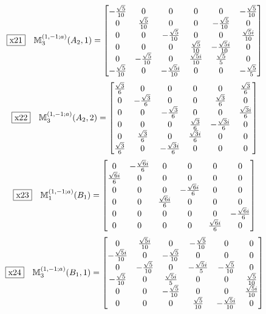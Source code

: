 \documentclass[fleqn,10pt,landscape]{jsarticle}
\begin{document}
\begin{dmath*}
\fbox{x21}\quad \mathbb{M}_{3}^{(1,-1;a)}(A_{2},1)=\begin{bmatrix} - \frac{\sqrt{5}}{10} & 0 & 0 & 0 & 0 & - \frac{\sqrt{5}}{10} \\ 0 & \frac{\sqrt{5}}{10} & 0 & 0 & - \frac{\sqrt{5}}{10} & 0 \\ 0 & 0 & - \frac{\sqrt{5}}{10} & 0 & 0 & \frac{\sqrt{5} i}{10} \\ 0 & 0 & 0 & \frac{\sqrt{5}}{10} & - \frac{\sqrt{5} i}{10} & 0 \\ 0 & - \frac{\sqrt{5}}{10} & 0 & \frac{\sqrt{5} i}{10} & \frac{\sqrt{5}}{5} & 0 \\ - \frac{\sqrt{5}}{10} & 0 & - \frac{\sqrt{5} i}{10} & 0 & 0 & - \frac{\sqrt{5}}{5} \end{bmatrix}
\end{dmath*}
\begin{dmath*}
\fbox{x22}\quad \mathbb{M}_{3}^{(1,-1;a)}(A_{2},2)=\begin{bmatrix} \frac{\sqrt{3}}{6} & 0 & 0 & 0 & 0 & \frac{\sqrt{3}}{6} \\ 0 & - \frac{\sqrt{3}}{6} & 0 & 0 & \frac{\sqrt{3}}{6} & 0 \\ 0 & 0 & - \frac{\sqrt{3}}{6} & 0 & 0 & \frac{\sqrt{3} i}{6} \\ 0 & 0 & 0 & \frac{\sqrt{3}}{6} & - \frac{\sqrt{3} i}{6} & 0 \\ 0 & \frac{\sqrt{3}}{6} & 0 & \frac{\sqrt{3} i}{6} & 0 & 0 \\ \frac{\sqrt{3}}{6} & 0 & - \frac{\sqrt{3} i}{6} & 0 & 0 & 0 \end{bmatrix}
\end{dmath*}
\begin{dmath*}
\fbox{x23}\quad \mathbb{M}_{1}^{(1,-1;a)}(B_{1})=\begin{bmatrix} 0 & - \frac{\sqrt{6} i}{6} & 0 & 0 & 0 & 0 \\ \frac{\sqrt{6} i}{6} & 0 & 0 & 0 & 0 & 0 \\ 0 & 0 & 0 & - \frac{\sqrt{6} i}{6} & 0 & 0 \\ 0 & 0 & \frac{\sqrt{6} i}{6} & 0 & 0 & 0 \\ 0 & 0 & 0 & 0 & 0 & - \frac{\sqrt{6} i}{6} \\ 0 & 0 & 0 & 0 & \frac{\sqrt{6} i}{6} & 0 \end{bmatrix}
\end{dmath*}
\begin{dmath*}
\fbox{x24}\quad \mathbb{M}_{3}^{(1,-1;a)}(B_{1},1)=\begin{bmatrix} 0 & \frac{\sqrt{5} i}{10} & 0 & - \frac{\sqrt{5}}{10} & 0 & 0 \\ - \frac{\sqrt{5} i}{10} & 0 & - \frac{\sqrt{5}}{10} & 0 & 0 & 0 \\ 0 & - \frac{\sqrt{5}}{10} & 0 & - \frac{\sqrt{5} i}{5} & - \frac{\sqrt{5}}{10} & 0 \\ - \frac{\sqrt{5}}{10} & 0 & \frac{\sqrt{5} i}{5} & 0 & 0 & \frac{\sqrt{5}}{10} \\ 0 & 0 & - \frac{\sqrt{5}}{10} & 0 & 0 & \frac{\sqrt{5} i}{10} \\ 0 & 0 & 0 & \frac{\sqrt{5}}{10} & - \frac{\sqrt{5} i}{10} & 0 \end{bmatrix}
\end{dmath*}
\end{document}
